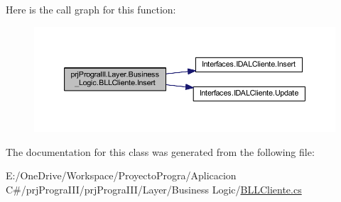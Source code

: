 Here is the call graph for this function\+:
\nopagebreak
\begin{figure}[H]
\begin{center}
\leavevmode
\includegraphics[width=350pt]{classprj_progra_i_i_i_1_1_layer_1_1_business___logic_1_1_b_l_l_cliente_a4412306e108649758d603cb510af7704_cgraph}
\end{center}
\end{figure}


The documentation for this class was generated from the following file\+:\begin{DoxyCompactItemize}
\item 
E\+:/\+One\+Drive/\+Workspace/\+Proyecto\+Progra/\+Aplicacion C\#/prj\+Progra\+I\+I\+I/prj\+Progra\+I\+I\+I/\+Layer/\+Business Logic/\hyperlink{_b_l_l_cliente_8cs}{B\+L\+L\+Cliente.\+cs}\end{DoxyCompactItemize}
